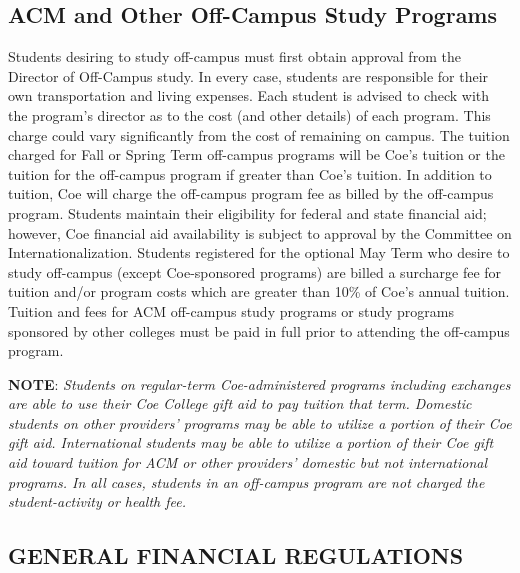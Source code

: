 \documentclass[
  letterpaper,
]{scrbook}
\begin{document}
\subsection{ACM and Other Off-Campus Study
Programs}\label{acm-and-other-off-campus-study-programs}

Students desiring to study off-campus must first obtain approval from
the Director of Off-Campus study. In every case, students are
responsible for their own transportation and living expenses. Each
student is advised to check with the program's director as to the cost
(and other details) of each program. This charge could vary
significantly from the cost of remaining on campus. The tuition charged
for Fall or Spring Term off-campus programs will be Coe's tuition or the
tuition for the off-campus program if greater than Coe's tuition. In
addition to tuition, Coe will charge the off-campus program fee as
billed by the off-campus program. Students maintain their eligibility
for federal and state financial aid; however, Coe financial aid
availability is subject to approval by the Committee on
Internationalization. Students registered for the optional May Term who
desire to study off-campus (except Coe-sponsored programs) are billed a
surcharge fee for tuition and/or program costs which are greater than
10\% of Coe's annual tuition. Tuition and fees for ACM off-campus study
programs or study programs sponsored by other colleges must be paid in
full prior to attending the off-campus program.

\textbf{NOTE}: \emph{Students on regular-term Coe-administered programs
including exchanges are able to use their Coe College gift aid to pay
tuition that term. Domestic students on other providers' programs may be
able to utilize a portion of their Coe gift aid. International students
may be able to utilize a portion of their Coe gift aid toward tuition
for ACM or other providers' domestic but not international programs. In
all cases, students in an off-campus program are not charged the
student-activity or health fee.}

\subsection{GENERAL FINANCIAL
REGULATIONS}\label{general-financial-regulations}
\end{document}
